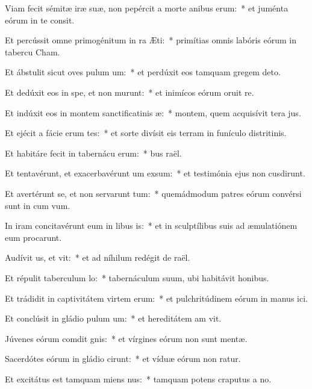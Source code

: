 \item Viam fecit sémitæ iræ suæ, non pepércit a morte anibus erum:~* et juménta eórum in te consit.
\item Et percússit omne primogénitum in ra Æti:~* primítias omnis labóris eórum in tabercu Cham.
\item Et ábstulit sicut oves pulum um:~* et perdúxit eos tamquam gregem  deto.
\item Et dedúxit eos in spe, et non murunt:~* et inimícos eórum oruit re.
\item Et indúxit eos in montem sanctificatinis æ:~* montem, quem acquisívit tera jus.
\item Et ejécit a fácie erum tes:~* et sorte divísit eis terram in funículo distritinis.
\item Et habitáre fecit in tabernácu erum:~* bus raël.
\item Et tentavérunt, et exacerbavérunt um exsum:~* et testimónia ejus non cusdirunt.
\item Et avertérunt se, et non servarunt tum:~* quemádmodum patres eórum convérsi sunt in cum vum.
\item In iram concitavérunt eum in libus is:~* et in sculptílibus suis ad æmulatiónem eum procarunt.
\item Audívit us, et vit:~* et ad níhilum redégit de raël.
\item Et répulit taberculum lo:~* tabernáculum suum, ubi habitávit  honibus.
\item Et trádidit in captivitátem virtem erum:~* et pulchritúdinem eórum in manus ici.
\item Et conclúsit in gládio pulum um:~* et hereditátem am vit.
\item Júvenes eórum comdit gnis:~* et vírgines eórum non sunt mentæ.
\item Sacerdótes eórum in gládio cirunt:~* et víduæ eórum non ratur.
\item Et excitátus est tamquam miens nus:~* tamquam potens craputus a no.
